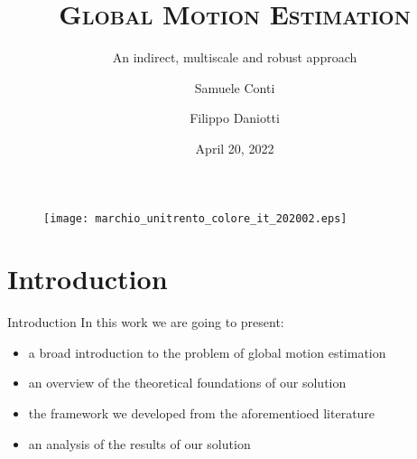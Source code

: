 \documentclass[aspectratio=1610,xcolor=dvipsnames]{beamer}
\author[Conti \and Daniotti]{Samuele Conti \and Filippo Daniotti}
\title[Global Motion Estimation]{\textsc{Global Motion Estimation}}
\subtitle{An indirect, multiscale and robust approach}
\institute[DISI - UniTN]{Department of Information Engineering\\and Computer Science}
\date{April 20, 2022}
\begin{document}
\begin{frame}
    \titlepage
    \begin{figure}[H]
        \begin{center}
            \texttt{[image: marchio\_unitrento\_colore\_it\_202002.eps]}
        \end{center}
    \end{figure}
\end{frame}

\begin{frame}
    \tableofcontents[sectionstyle=show,subsectionstyle=show/shaded/hide,subsubsectionstyle=show/shaded/hide]
\end{frame}

\section{Introduction}
\begin{frame}{Introduction}
    In this work we are going to present:
    \begin{itemize}
        \item a broad introduction to the problem of global motion estimation
        \item an overview of the theoretical foundations of our solution
        \item the framework we developed from the aforementioed literature
        \item an analysis of the results of our solution 
    \end{itemize}
\end{frame}
\end{document}

